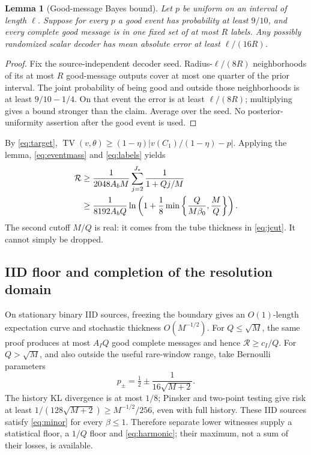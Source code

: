 \documentclass[11pt,letterpaper]{article}
\newtheorem{lemma}[theorem]{Lemma}
\theoremstyle{definition}\newtheorem{definition}[theorem]{Definition}
\theoremstyle{remark}\newtheorem{remark}[theorem]{Remark}
\newcommand{\TV}{\operatorname{TV}}
\newcommand{\betaz}{\beta_0}
\newcommand{\Risk}{\mathcal{R}}
\begin{document}
\begin{lemma}[Good-message Bayes bound]\label{lem:messages}
Let $p$ be uniform on an interval of length $\ell$. Suppose for every $p$ a good event has probability at least $9/10$, and every complete good message is in one fixed set of at most $R$ labels. Any possibly randomized scalar decoder has mean absolute error at least $\ell/(16R)$.
\end{lemma}
\begin{proof}
Fix the source-independent decoder seed. Radius-$\ell/(8R)$ neighborhoods of its at most $R$ good-message outputs cover at most one quarter of the prior interval. The joint probability of being good and outside those neighborhoods is at least $9/10-1/4$. On that event the error is at least $\ell/(8R)$; multiplying gives a bound stronger than the claim. Average over the seed. No posterior-uniformity assertion after the good event is used.
\end{proof}

By \eqref{eq:target}, $\TV(v,\theta)\ge(1-\eta)|v(C_1)/(1-\eta)-p|$. Applying the lemma, \eqref{eq:eventmass} and \eqref{eq:labels} yields
\begin{align}\label{eq:harmonic}
 \Risk&\ge\frac1{2048A_bM}\sum_{j=2}^{J_*}\frac1{1+Qj/M}\notag\\
 &\ge\frac1{8192A_bQ}\ln\left(1+\frac18\min\left\{\frac{Q}{M\betaz},\frac M Q\right\}\right).
\end{align}
The second cutoff $M/Q$ is real: it comes from the tube thickness in \eqref{eq:jcut}. It cannot simply be dropped.

\subsection{IID floor and completion of the resolution domain}\label{sec:completion}
On stationary binary IID sources, freezing the boundary gives an $O(1)$-length expectation curve and stochastic thickness $O(M^{-1/2})$. For $Q\le\sqrt M$, the same proof produces at most $A_IQ$ good complete messages and hence $\Risk\ge c_I/Q$. For $Q>\sqrt M$, and also outside the useful rare-window range, take Bernoulli parameters
\[
 p_\pm=\tfrac12\pm\frac1{16\sqrt{M+2}}.
\]
The history KL divergence is at most $1/8$; Pinsker and two-point testing give risk at least $1/(128\sqrt{M+2})\ge M^{-1/2}/256$, even with full history. These IID sources satisfy \eqref{eq:minor} for every $\beta\le1$. Therefore separate lower witnesses supply a statistical floor, a $1/Q$ floor and \eqref{eq:harmonic}; their maximum, not a sum of their losses, is available.
\end{document}

